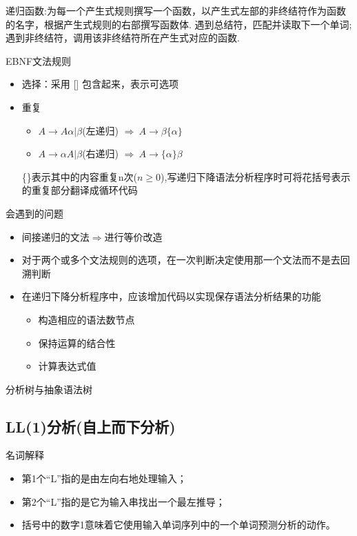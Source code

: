 \documentclass[utf8]{ctexart}
\begin{document}
递归函数:为每一个产生式规则撰写一个函数，以产生式左部的非终结符作为函数的名字，根据产生式规则的右部撰写函数体.
遇到总结符，匹配并读取下一个单词;遇到非终结符，调用该非终结符所在产生式对应的函数.

\noindent EBNF文法规则
\begin{itemize}
    \item 选择：采用 [] 包含起来，表示可选项
    \item 重复
    \begin{itemize}
        \item $A \rightarrow A\alpha | \beta$(左递归) $\Rightarrow  \ A \rightarrow \beta\{\alpha\}$ 
        \item $A \rightarrow \alpha A| \beta$(右递归) $\Rightarrow  \ A \rightarrow \{\alpha\}\beta$ 
    \end{itemize}
    \{\}表示其中的内容重复n次($n \geq 0$),写递归下降语法分析程序时可将花括号表示的重复部分翻译成循环代码
\end{itemize}

\noindent 会遇到的问题

\begin{itemize}
    \item 间接递归的文法$\Rightarrow$进行等价改造
    \item 对于两个或多个文法规则的选项，在一次判断决定使用那一个文法而不是去回溯判断
    \item 在递归下降分析程序中，应该增加代码以实现保存语法分析结果的功能
    \begin{itemize}
        \item 构造相应的语法数节点
        \item 保持运算的结合性
        \item 计算表达式值
    \end{itemize}
\end{itemize}

分析树与抽象语法树

\subsection{LL(1)分析(自上而下分析)}
\noindent 名词解释
\begin{itemize}
   \item 第1个“L”指的是由左向右地处理输入；
   \item 第2个“L”指的是它为输入串找出一个最左推导；
   \item 括号中的数字1意味着它使用输入单词序列中的一个单词预测分析的动作。
\end{itemize}
\end{document}
